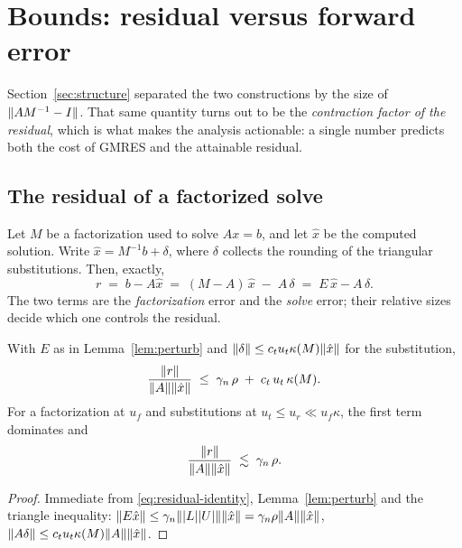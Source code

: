 
\section{Bounds: residual versus forward error}\label{sec:bounds}

Section~\ref{sec:structure} separated the two constructions by the size of
$\lVert AM^{-1}-I \rVert$. That same quantity turns out to be the \emph{contraction
factor of the residual}, which is what makes the analysis actionable: a single
number predicts both the cost of GMRES and the attainable residual.

\subsection{The residual of a factorized solve}

Let $M$ be a factorization used to solve $Ax=b$, and let $\hat x$ be the computed
solution. Write $\hat x=M^{-1}b+\delta$, where $\delta$ collects the rounding of
the triangular substitutions. Then, exactly,
\begin{equation}\label{eq:residual-identity}
  r \;=\; b-A\hat x \;=\; (M-A)\,\hat x \;-\; A\,\delta \;=\; E\,\hat x - A\,\delta .
\end{equation}
The two terms are the \emph{factorization} error and the \emph{solve} error; their
relative sizes decide which one controls the residual.

\begin{proposition}\label{prop:residual}
With $E$ as in Lemma~\ref{lem:perturb} and $\lVert \delta \rVert\le c_tu_t\kappa(M)\lVert \hat x \rVert$
for the substitution,
\begin{equation}
  \frac{\lVert r \rVert}{\lVert A \rVert\lVert \hat x \rVert}
  \;\le\; \gamma_n\,\rho \;+\; c_t\,u_t\,\kappa(M).
\end{equation}
For a factorization at $u_f$ and substitutions at $u_t\le u_r\ll u_f\kappa$, the
first term dominates and
\begin{equation}
  \frac{\lVert r \rVert}{\lVert A \rVert\lVert \hat x \rVert} \;\lesssim\; \gamma_n\,\rho .
\end{equation}
\end{proposition}

\begin{proof}
Immediate from \eqref{eq:residual-identity}, Lemma~\ref{lem:perturb} and the
triangle inequality:
$\lVert E\hat x \rVert\le\gamma_n\lVert \lvert L \rvert\lvert U \rvert \rVert\lVert \hat x \rVert=\gamma_n\rho\lVert A \rVert\lVert \hat x \rVert$,
$\lVert A\delta \rVert\le c_tu_t\kappa(M)\lVert A \rVert\lVert \hat x \rVert$.
\end{proof}

